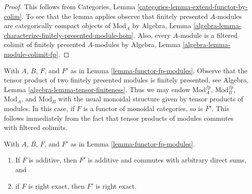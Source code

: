 \begin{proof}
This follows from
Categories, Lemma \ref{categories-lemma-extend-functor-by-colim}.
To see that the lemma applies observe that
finitely presented $A$-modules are
categorically compact objects of $\text{Mod}_A$ by
Algebra, Lemma \ref{algebra-lemma-characterize-finitely-presented-module-hom}.
Also, every $A$-module is a filtered colimit
of finitely presented $A$-modules by
Algebra, Lemma \ref{algebra-lemma-module-colimit-fp}.
\end{proof}

\begin{remark}
\label{remark-monoidal-extension}
With $A$, $B$, $F$, and $F'$ as in Lemma \ref{lemma-functor-fp-modules}.
Observe that the tensor product of two finitely presented modules is
finitely presented, see Algebra, Lemma \ref{algebra-lemma-tensor-finiteness}.
Thus we may endow $\text{Mod}^{fp}_A$, $\text{Mod}^{fp}_B$,
$\text{Mod}_A$, and $\text{Mod}_B$ with the usual monoidal structure
given by tensor products of modules. In this case, if $F$ is
a functor of monoidal categories, so is $F'$. This follows immediately
from the fact that tensor products of modules commutes with filtered
colimits.
\end{remark}

\begin{lemma}
\label{lemma-functor-fp-modules-exact}
With $A$, $B$, $F$, and $F'$ as in Lemma \ref{lemma-functor-fp-modules}.
\begin{enumerate}
\item If $F$ is additive, then $F'$ is additive and
commutes with arbitrary direct sums, and
\item if $F$ is right exact, then $F'$ is right exact.
\end{enumerate}
\end{lemma}

